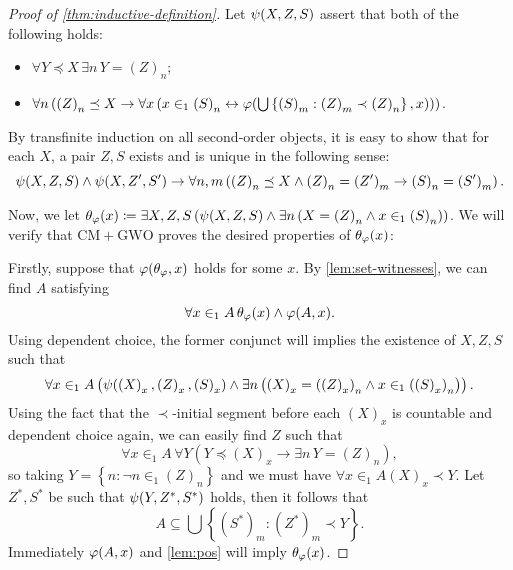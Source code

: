 \documentclass[11pt]{article}
\theoremstyle{plain}
\theoremstyle{definition}
\begin{document}
\begin{proof}[Proof of \autoref{thm:inductive-definition}]
    Let $\psi\mleft(X, Z, S\mright)$ assert that both of the following holds:
    \begin{itemize}
        \item $\forall Y \preceq X \, \exists n \, Y = \left(Z\right)_n$;
        \item $\forall n \left(\left(Z\right)_n \preceq X \rightarrow \forall x \left(x \in_1 \left(S\right)_n \leftrightarrow \varphi\mleft(\bigcup \left\{\left(S\right)_m : \left(Z\right)_m \prec \left(Z\right)_n\right\}, x\mright)\right)\right)$.
    \end{itemize}
    By transfinite induction on all second-order objects, it is easy to show that for each $X$, a pair $Z, S$ exists and is unique in the following sense:
    \[\psi\mleft(X, Z, S\mright) \land \psi\mleft(X, Z', S'\mright) \rightarrow \forall n, m \left(\left(Z\right)_n \preceq X \land \left(Z\right)_n = \left(Z'\right)_m \rightarrow \left(S\right)_n = \left(S'\right)_m\right).\]

    Now, we let $\theta_\varphi\mleft(x\mright) \coloneqq \exists X, Z, S \left(\psi\mleft(X, Z, S\mright) \land \exists n \left(X = \left(Z\right)_n \land x \in_1 \left(S\right)_n\right)\right)$. We will verify that $\mathrm{CM} + \mathrm{GWO}$ proves the desired properties of $\theta_\varphi\mleft(x\mright)$:

    Firstly, suppose that $\varphi\mleft(\theta_\varphi, x\mright)$ holds for some $x$. By \autoref{lem:set-witnesses}, we can find $A$ satisfying
    \[\forall x \in_1 A \, \theta_\varphi\mleft(x\mright) \land \varphi\mleft(A, x\mright).\]
    Using dependent choice, the former conjunct will implies the existence of $X, Z, S$ such that
    \[\forall x \in_1 A \left(\psi\mleft(\left(X\right)_x, \left(Z\right)_x, \left(S\right)_x\mright) \land \exists n \left(\left(X\right)_x = \left(\left(Z\right)_x\right)_n \land x \in_1 \left(\left(S\right)_x\right)_n\right)\right).\]
    Using the fact that the $\prec$-initial segment before each $\left(X\right)_x$ is countable and dependent choice again, we can easily find $Z$ such that
    \[\forall x \in_1 A \, \forall Y \left(Y \preceq \left(X\right)_x \rightarrow \exists n \, Y = \left(Z\right)_n\right),\]
    so taking $Y = \left\{n : \neg n \in_1 \left(Z\right)_n\right\}$ and we must have $\forall x \in_1 A \left(X\right)_x \prec Y$. Let $Z^*, S^*$ be such that $\psi\mleft(Y, Z^*, S^*\mright)$ holds, then it follows that
    \[A \subseteq \bigcup \left\{\left(S^*\right)_m : \left(Z^*\right)_m \prec Y\right\}.\]
    Immediately $\varphi\mleft(A, x\mright)$ and \autoref{lem:pos} will imply $\theta_\varphi\mleft(x\mright)$.


\end{proof}
\end{document}

